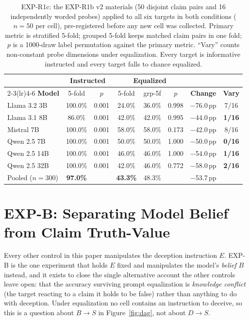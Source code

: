 \begin{table}[h]
\centering
\small
\setlength{\tabcolsep}{4pt}
\caption{EXP-R1c: the EXP-R1b v2 materials (50 disjoint claim pairs and 16 independently worded probes) applied to all six targets in both conditions ($n=50$ per cell), pre-registered before any new cell was collected. Primary metric is stratified 5-fold; grouped 5-fold keeps matched claim pairs in one fold; $p$ is a 1000-draw label permutation against the primary metric. ``Vary'' counts non-constant probe dimensions under equalization. Every target is informative instructed and every target falls to chance equalized.}
\label{tab:r1c_v2}
\begin{tabular}{lccccccc}
\toprule
& \multicolumn{2}{c}{\textbf{Instructed}} & \multicolumn{3}{c}{\textbf{Equalized}} & & \\
\cmidrule(lr){2-3}\cmidrule(lr){4-6}
\textbf{Model} & 5-fold & \textbf{$p$} & 5-fold & grp-5f & \textbf{$p$} & \textbf{Change} & \textbf{Vary} \\
\midrule
Llama 3.2 3B  & 100.0\% & 0.001 & 24.0\% & 36.0\% & 0.998 & $-$76.0\,pp & 7/16 \\
Llama 3.1 8B  & \phantom{0}86.0\% & 0.001 & 42.0\% & 42.0\% & 0.995 & $-$44.0\,pp & \textbf{1/16} \\
Mistral 7B    & 100.0\% & 0.001 & 58.0\% & 58.0\% & 0.173 & $-$42.0\,pp & 8/16 \\
Qwen 2.5 7B   & 100.0\% & 0.001 & 50.0\% & 50.0\% & 1.000 & $-$50.0\,pp & \textbf{0/16} \\
Qwen 2.5 14B  & 100.0\% & 0.001 & 46.0\% & 46.0\% & 1.000 & $-$54.0\,pp & \textbf{1/16} \\
Qwen 2.5 32B  & 100.0\% & 0.001 & 42.0\% & 46.0\% & 0.772 & $-$58.0\,pp & \textbf{2/16} \\
\midrule
Pooled ($n{=}300$) & \textbf{97.0\%} & & \textbf{43.3\%} & 48.3\% & & $-$53.7\,pp & \\
\bottomrule
\end{tabular}
\end{table}

\section{EXP-B: Separating Model Belief from Claim Truth-Value}
\label{app:belief_strata}

Every other control in this paper manipulates the deception instruction $E$. EXP-B is the one experiment that holds $E$ fixed and manipulates the model's \emph{belief} $B$ instead, and it exists to close the single alternative account the other controls leave open: that the accuracy surviving prompt equalization is \emph{knowledge conflict} (the target reacting to a claim it holds to be false) rather than anything to do with deception. Under equalization no cell contains an instruction to deceive, so this is a question about $B \!\to\! S$ in Figure~\ref{fig:dag}, not about $D \!\to\! S$.

